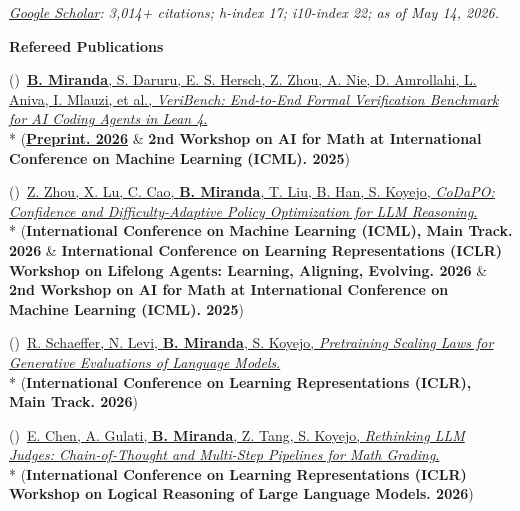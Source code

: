 \documentclass{article}
\newenvironment{changemargin}[2]{%
  \begin{list}{}{%
    \setlength{\topsep}{0pt}%
    \setlength{\leftmargin}{#1}%
    \setlength{\rightmargin}{#2}%
    \setlength{\listparindent}{\parindent}%
    \setlength{\itemindent}{\parindent}%
    \setlength{\parsep}{\parskip}%
  }%
  \item[]}{\end{list}
}
\newenvironment{body} {
		\vspace*{-16pt}
		\begin{changemargin}{-0.25in}{-0.5in}
	  }
		{\end{changemargin}\vspace{8pt plus 12pt}
	}
\newcounter{pubnum}
\newcommand{\pubitem}{\stepcounter{pubnum}(\thepubnum)~}
\begin{document}
\begin{body}
    \vspace{6pt} %

    \vspace{8pt}
    \emph{\href{https://scholar.google.com/citations?user=_NQJoBkAAAAJ&hl=en}{Google Scholar}: 3,014+ citations; h-index 17; i10-index 22; as of May 14, 2026.}

    \vspace{8pt}
    \textbf{Refereed Publications}
    \par\nopagebreak[4]\vspace{4pt}
    \setcounter{pubnum}{0}

    \pubitem \href{https://cs.stanford.edu/people/brando9/veribench/blog/veribench-launch/}
    {\textbf{B. Miranda}, S. Daruru, E. S. Hersch, Z. Zhou, A. Nie, D. Amrollahi, L. Aniva, I. Mlauzi, et al.,
    \emph{VeriBench: End-to-End Formal Verification Benchmark for AI Coding Agents in Lean 4}.}
    \\*
    (\href{https://purl.stanford.edu/nw314gc8770}{\textbf{Preprint. 2026}} \& \textbf{2nd Workshop on AI for Math at International Conference on Machine Learning (ICML). 2025})

    \vspace{10pt}
    \pubitem \href{https://openreview.net/forum?id=8OoZ8dnvIT}
    {Z. Zhou, X. Lu, C. Cao, \textbf{B. Miranda}, T. Liu, B. Han, S. Koyejo,
    \emph{CoDaPO: Confidence and Difficulty-Adaptive Policy Optimization for LLM Reasoning}.}
    \\*
    (\textbf{International Conference on Machine Learning (ICML), Main Track. 2026} \& \textbf{International Conference on Learning Representations (ICLR) Workshop on Lifelong Agents: Learning, Aligning, Evolving. 2026} \& \textbf{2nd Workshop on AI for Math at International Conference on Machine Learning (ICML). 2025})

    \vspace{10pt}
    \pubitem \href{https://openreview.net/forum?id=Ym33xJYINV}
    {R. Schaeffer, N. Levi, \textbf{B. Miranda}, S. Koyejo,
    \emph{Pretraining Scaling Laws for Generative Evaluations of Language Models}.}
    \\*
    (\textbf{International Conference on Learning Representations (ICLR), Main Track. 2026})

    \vspace{10pt}
    \pubitem \href{https://openreview.net/forum?id=vdXPorr099}
    {E. Chen, A. Gulati, \textbf{B. Miranda}, Z. Tang, S. Koyejo,
    \emph{Rethinking LLM Judges: Chain-of-Thought and Multi-Step Pipelines for Math Grading}.}
    \\*
    (\textbf{International Conference on Learning Representations (ICLR) Workshop on Logical Reasoning of Large Language Models. 2026})


\end{body}
\end{document}
